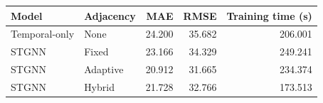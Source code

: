 \begin{tabular}{llrrr}
\toprule
Model & Adjacency & MAE & RMSE & Training time (s) \\
\midrule
Temporal-only & None & 24.200 & 35.682 & 206.001 \\
STGNN & Fixed & 23.166 & 34.329 & 249.241 \\
STGNN & Adaptive & 20.912 & 31.665 & 234.374 \\
STGNN & Hybrid & 21.728 & 32.766 & 173.513 \\
\bottomrule
\end{tabular}
